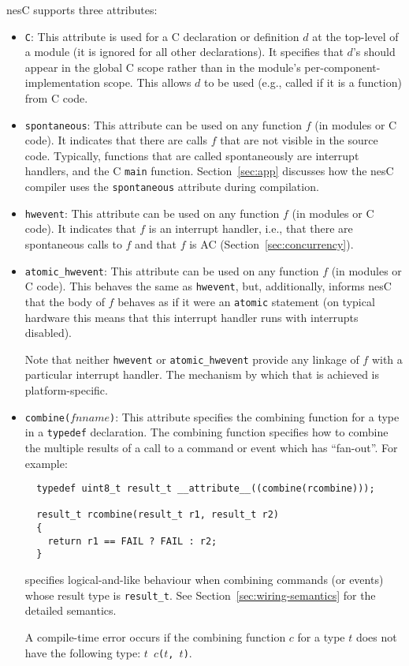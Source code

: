 \documentclass[11pt,letterpaper]{article}
\newcommand{\kw}[1]{{\tt #1}}
\newcommand{\code}[1]{{\tt #1}}
\newcommand{\nesc}{nesC\xspace}
\begin{document}
\nesc supports three attributes:
\begin{itemize}
\item \code{C}: This attribute is used for a C declaration or definition
$d$ at the top-level of a module (it is ignored for all other
declarations). It specifies that $d$'s should appear in the global C scope
rather than in the module's per-component-implementation scope. This allows
$d$ to be used (e.g., called if it is a function) from C code.

\item \code{spontaneous}: This attribute can be used on any function
$f$ (in modules or C code). It indicates that there are calls $f$ that
are not visible in the source code. Typically, functions that are
called spontaneously are interrupt handlers, and the C \code{main}
function. Section~\ref{sec:app} discusses how the \nesc compiler
uses the \code{spontaneous} attribute during compilation.

\item \code{hwevent}: This attribute can be used on any function $f$ (in
modules or C code). It indicates that $f$ is an interrupt handler, i.e.,
that there are spontaneous calls to $f$ and that $f$ is AC
(Section~\ref{sec:concurrency}).

\item \code{atomic\_hwevent}: This attribute can be used on any function
$f$ (in modules or C code). This behaves the same as \code{hwevent}, but,
additionally, informs \nesc that the body of $f$ behaves as if it
were an \kw{atomic} statement (on typical hardware this means that this
interrupt handler runs with interrupts disabled).

Note that neither \code{hwevent} or \code{atomic\_hwevent} provide any
linkage of $f$ with a particular interrupt handler. The mechanism by
which that is achieved is platform-specific.

\item \code{combine($fnname$)}: This attribute specifies the combining
function for a type in a \kw{typedef} declaration. The combining function
specifies how to combine the multiple results of a call to a command
or event which has ``fan-out''. For example:
\begin{verbatim}
  typedef uint8_t result_t __attribute__((combine(rcombine)));

  result_t rcombine(result_t r1, result_t r2)
  {
    return r1 == FAIL ? FAIL : r2;
  }
\end{verbatim}
specifies logical-and-like behaviour when combining commands (or events)
whose result type is \code{result\_t}. See
Section~\ref{sec:wiring-semantics} for the detailed semantics.

A compile-time error occurs if the combining function $c$ for a type $t$
does not have the following type: \code{$t$ $c$($t$, $t$)}.

\end{itemize}
\end{document}
